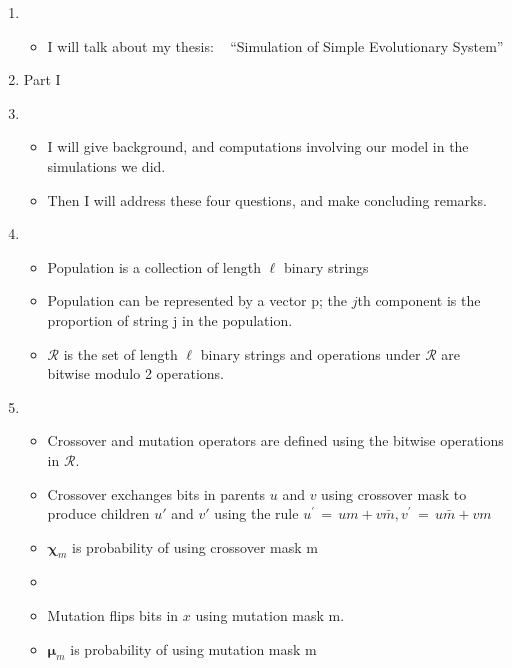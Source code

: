 \documentclass{article}
\begin{document}
\setcounter{page}{1}    
\newlength{\mywidth}
\setlength{\mywidth}{0.9\linewidth}
\newlength{\myheight}
\setlength{\myheight}{0.5in}
    
\begin{enumerate}
\item
  \begin{itemize}
  \item I will talk about my thesis: \hfill\mbox{ }\linebreak
      ``Simulation of Simple Evolutionary System'' 
  \end{itemize}
  
  \item Part I
    
\item
  \begin{itemize}
  \item      
      I will give background, and computations involving our model in the simulations we did. 
  \item
      Then I will address these four questions, and make
      concluding remarks.    
  \end{itemize}

\item
  \begin{itemize}
  \item Population is a collection of length $\ell$ binary strings 
  \item Population can be represented by a vector p; the $j$th component
      is the proportion of string j in the population.
    \item $\mathcal{R}$ is the set of length $\ell$ binary strings and operations under $\mathcal{R}$ are bitwise modulo 2 operations.
  \end{itemize}
    
\item
  \begin{itemize}
  \item Crossover and mutation operators are defined using the
    bitwise operations in $\mathcal{R}$.
  \item Crossover exchanges bits in parents $u$ and $v$ using crossover mask to produce children $u'$ and $v'$ 
  using the rule $u^\prime \,=\, um + v\bar{m} , v^\prime \,=\, u\bar{m} + vm$
  \item $\bm{\chi}_m$ is probability of using crossover mask m
  \item
  \item Mutation flips bits in $x$ using mutation mask m.
  \item $\bm{\mu}_m$ is probability of using mutation mask m
  \end{itemize}
    

\end{enumerate}
\end{document}
